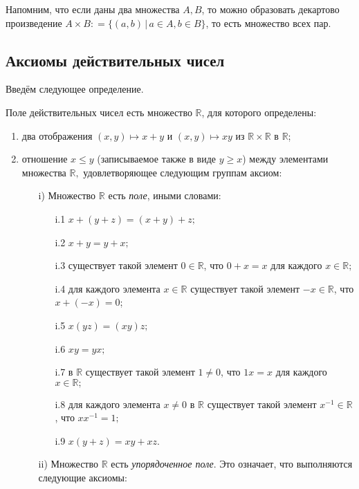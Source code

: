 Напомним, что если даны два множества $A, B$, то можно образовать декартово произведение $A\times B: = \{(a,b)\,|\, a\in A, b\in B\}$, то есть множество всех пар.

\subsection{Аксиомы действительных чисел}

Введём следующее определение.

\begin{definition}\label{field}
 Поле действительных чисел есть множество $\mathbb{R}$, для которого определены:
\begin{enumerate}
    \item два отображения $(x,y)\mapsto x+y$ и $(x,y) \mapsto xy$ из $\mathbb{R}\times \mathbb{R}$ в $\mathbb{R}$;
    \item отношение $x \le y$ (записываемое также в виде $y \ge  x$) между элементами множества $\mathbb{R},$ удовлетворяющее следующим группам аксиом:
     \begin{itemize}
         \item[i)] Множество $\mathbb{R}$ есть \textit{поле}, иными словами:
         \begin{itemize}
             \item[i.1] $x+ (y+z) = (x+y)+z;$
             \item[i.2] $x+y = y+x;$
             \item[i.3] существует такой элемент $0 \in \mathbb{R}$, что $0+x= x$ для каждого $x \in \mathbb{R};$
             \item[i.4] для каждого элемента $x\in \mathbb{R}$ существует такой элемент $-x \in \mathbb{R}$, что $x+(-x) = 0$;
             \item[i.5] $x(yz) = (xy)z;$
             \item [i.6] $xy = yx;$
             \item[i.7] в $\mathbb{R}$ существует такой элемент $1 \ne 0$, что $1 x = x$ для каждого $x\in \mathbb{R};$
             \item[i.8] для каждого элемента $x \ne 0$ в $\mathbb{R}$ существует такой элемент $x^{-1} \in \mathbb{R}$, что $xx^{-1} = 1;$
             \item[i.9] $x(y+z) = xy + xz$.
         \end{itemize}
         \item[ii)] Множество $\mathbb{R}$ есть \textit{упорядоченное поле}. Это означает, что выполняются следующие аксиомы:

\end{itemize}
\end{enumerate}
\end{definition}
